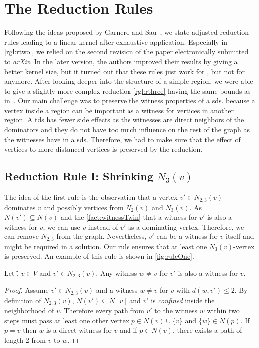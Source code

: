 \section{The Reduction Rules}

Following the ideas proposed by Garnero and Sau~\cite[arXiv v2]{Garnero2018}, we state adjusted reduction rules leading to a linear kernel after exhaustive application. 
Especially in \cref{rgl:rtwo}, we relied on the second revision of the paper electronically submitted to \textit{arXiv}.
In the later version, the authors improved their results by giving a better kernel size, but it turned out that these rules just work for \tdom, but not for \sdom anymore.
After looking deeper into the structure of a simple region, we were able to give a slightly more complex reduction \cref{rgl:rthree} having the same bounds as in~\cite{Garnero2018}.  
Our main challenge was to preserve the witness properties of a sds.
 because a vertex inside a region can be important as a witness for vertices in another region. 
A tds has fewer side effects as the witnesses are direct neighbors of the dominators and they do not have too much influence on the rest of the graph as the witnesses have in a sds.
Therefore, we had to make sure that the effect of vertices to more distanced vertices is preserved by the reduction.

\subsection{Reduction Rule I: Shrinking $N_3(v)$}


The idea of the first rule is the observation that a vertex $v' \in N_{2,3}(v)$ dominates $v$ and possibly vertices from $N_2(v)$ and $N_3(v)$. As $N(v') \subseteq N(v)$ and the \cref{fact:witnessTwin} that a witness for $v'$ is also a witness for $v$, we can use $v$ instead of $v'$ as a dominating vertex. Therefore, we can remove $N_{2,3}$ from the graph. Nevertheless, $v'$ can be a witness for $v$ itself and might be required in a solution. Our rule ensures that at least one $N_3(v)$-vertex is preserved. An example of this rule is shown in \cref{fig:ruleOne}.

\begin{fact}\label{fact:witnessTwin}
Let \G, $v \in V$ and $v' \in N_{2,3}(v)$. Any witness $w \neq v$ for $v'$ is also a witness for $v$. %
\end{fact}
\begin{proof}

Assume $v' \in N_{2,3}(v)$ and a witness $w \neq v$ for $v$ with $d(w,v') \leq 2$. 
By definition of $N_{2,3}(v)$, $N(v') \subseteq N[v]$ and $v'$ is \textit{confined} inside the neighborhood of $v$. 
Therefore every path from $v'$ to the witness $w$ within two steps must pass at least one other vertex $p \in N(v) \cup \{v\}$ and $\{w\} \in N(p)$.
If $p = v$ then $w$ is a direct witness for $v$ and if $p \in N(v)$, there exists a path of length 2 from $v$ to $w$.
\end{proof}

